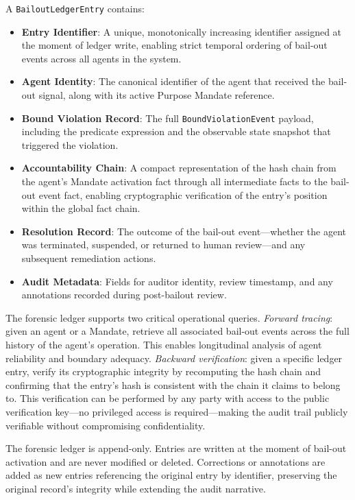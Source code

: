 A \texttt{BailoutLedgerEntry} contains:

\begin{itemize}
  \item \textbf{Entry Identifier}: A unique, monotonically increasing identifier assigned at the moment of ledger write, enabling strict temporal ordering of bail-out events across all agents in the system.
  \item \textbf{Agent Identity}: The canonical identifier of the agent that received the bail-out signal, along with its active Purpose Mandate reference.
  \item \textbf{Bound Violation Record}: The full \texttt{BoundViolationEvent} payload, including the predicate expression and the observable state snapshot that triggered the violation.
  \item \textbf{Accountability Chain}: A compact representation of the hash chain from the agent's Mandate activation fact through all intermediate facts to the bail-out event fact, enabling cryptographic verification of the entry's position within the global fact chain.
  \item \textbf{Resolution Record}: The outcome of the bail-out event—whether the agent was terminated, suspended, or returned to human review—and any subsequent remediation actions.
  \item \textbf{Audit Metadata}: Fields for auditor identity, review timestamp, and any annotations recorded during post-bailout review.
\end{itemize}

The forensic ledger supports two critical operational queries. \emph{Forward tracing}: given an agent or a Mandate, retrieve all associated bail-out events across the full history of the agent's operation. This enables longitudinal analysis of agent reliability and boundary adequacy. \emph{Backward verification}: given a specific ledger entry, verify its cryptographic integrity by recomputing the hash chain and confirming that the entry's hash is consistent with the chain it claims to belong to. This verification can be performed by any party with access to the public verification key—no privileged access is required—making the audit trail publicly verifiable without compromising confidentiality.

The forensic ledger is append-only. Entries are written at the moment of bail-out activation and are never modified or deleted. Corrections or annotations are added as new entries referencing the original entry by identifier, preserving the original record's integrity while extending the audit narrative.

